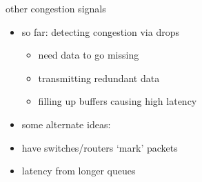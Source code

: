 \begin{frame}{other congestion signals}
\begin{itemize}
\item so far: detecting congestion via drops
    \begin{itemize}
    \item need data to go missing
    \item transmitting redundant data
    \item filling up buffers causing high latency
    \end{itemize}
\vspace{.5cm}
\item some alternate ideas:
\item have switches/routers `mark' packets
\item latency from longer queues
\end{itemize}
\end{frame}
